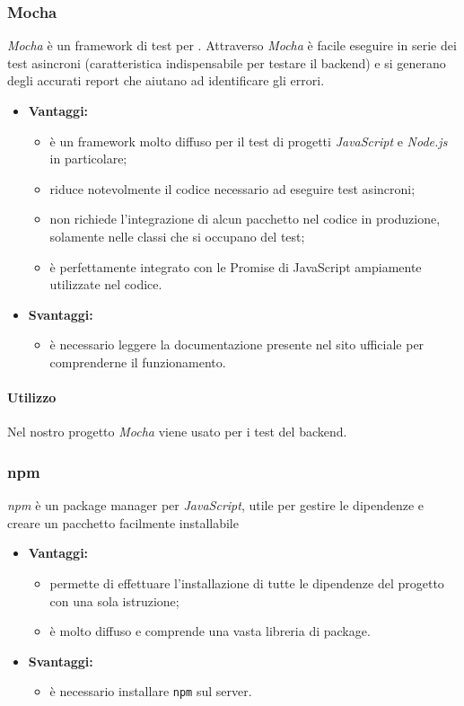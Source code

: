 		\subsubsection{Mocha}
		\textit{Mocha} è un framework di test per . Attraverso \textit{Mocha} è facile eseguire in serie dei test asincroni (caratteristica indispensabile per testare il backend) e si generano degli accurati report che aiutano ad identificare gli errori.

			\begin{itemize}
				\item \textbf{Vantaggi:}
					\begin{itemize}
						\item è un framework molto diffuso per il test di progetti \textit{JavaScript} e \textit{Node.js} in particolare;
						\item riduce notevolmente il codice necessario ad eseguire test asincroni;
						\item non richiede l'integrazione di alcun pacchetto nel codice in produzione, solamente nelle classi che si occupano del test;
						\item è perfettamente integrato con le Promise di JavaScript ampiamente utilizzate nel codice.
					\end{itemize}
				\item \textbf{Svantaggi:}
					\begin{itemize}
						\item è necessario leggere la documentazione presente nel sito ufficiale per comprenderne il funzionamento.
					\end{itemize}
			\end{itemize}
			\paragraph{Utilizzo}
			Nel nostro progetto \textit{Mocha} viene usato per i test del backend.


			\subsubsection{npm}
			\textit{npm} è un package manager per \textit{JavaScript}, utile per gestire le dipendenze e creare un pacchetto facilmente installabile

				\begin{itemize}
					\item \textbf{Vantaggi:}
						\begin{itemize}
							\item permette di effettuare l'installazione di tutte le dipendenze del progetto con una sola istruzione;
							\item è molto diffuso e comprende una vasta libreria di package.
						\end{itemize}
					\item \textbf{Svantaggi:}
						\begin{itemize}
							\item è necessario installare \texttt{npm} sul server.
						\end{itemize}
				\end{itemize}
